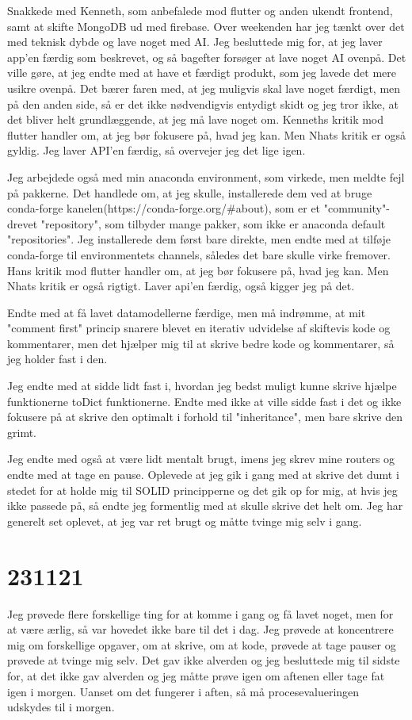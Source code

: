 \documentclass{report}
\begin{document}
Snakkede med Kenneth, som anbefalede mod flutter og anden ukendt frontend, samt at skifte MongoDB ud med firebase.
Over weekenden har jeg tænkt over det med teknisk dybde og lave noget med AI. Jeg besluttede mig for, at jeg laver app'en færdig som beskrevet, og så bagefter forsøger at lave noget AI ovenpå. Det ville gøre, at jeg endte med at have et færdigt produkt, som jeg lavede det mere usikre ovenpå. Det bærer faren med, at jeg muligvis skal lave noget færdigt, men på den anden side, så er det ikke nødvendigvis entydigt skidt og jeg tror ikke, at det bliver helt grundlæggende, at jeg må lave noget om.
Kenneths kritik mod flutter handler om, at jeg bør fokusere på, hvad jeg kan. Men Nhats kritik er også gyldig.
Jeg laver API'en færdig, så overvejer jeg det lige igen.
 
Jeg arbejdede også med min anaconda environment, som virkede, men meldte fejl på pakkerne. Det handlede om, at jeg skulle, installerede dem ved at bruge conda-forge kanelen(https://conda-forge.org/\#about), som er et "community"-drevet "repository", som tilbyder mange pakker, som ikke er anaconda default "repositories". Jeg installerede dem først bare direkte, men endte med at tilføje conda-forge til environmentets channels, således det bare skulle virke fremover.
Hans kritik mod flutter handler om, at jeg bør fokusere på, hvad jeg kan. Men Nhats kritik er også rigtigt. Laver api'en færdig, også kigger jeg på det.
 
Endte med at få lavet datamodellerne færdige, men må indrømme, at mit "comment first" princip snarere blevet en iterativ udvidelse af skiftevis kode og kommentarer, men det hjælper mig til at skrive bedre kode og kommentarer, så jeg holder fast i den.
 
Jeg endte med at sidde lidt fast i, hvordan jeg bedst muligt kunne skrive hjælpe funktionerne toDict funktionerne. Endte med ikke at ville sidde fast i det og ikke fokusere på at skrive den optimalt i forhold til "inheritance", men bare skrive den grimt.
 
Jeg endte med også at være lidt mentalt brugt, imens jeg skrev mine routers og endte med at tage en pause. Oplevede at jeg gik i gang med at skrive det dumt i stedet for at holde mig til SOLID principperne og det gik op for mig, at hvis jeg ikke passede på, så endte jeg formentlig med at skulle skrive det helt om.
Jeg har generelt set oplevet, at jeg var ret brugt og måtte tvinge mig selv i gang.

\section{231121}
Jeg prøvede flere forskellige ting for at komme i gang og få lavet noget, men for at være ærlig, så var hovedet ikke bare til det i dag.
Jeg prøvede at koncentrere mig om forskellige opgaver, om at skrive, om at kode, prøvede at tage pauser og prøvede at tvinge mig selv.
Det gav ikke alverden og jeg besluttede mig til sidste for, at det ikke gav alverden og jeg måtte prøve igen om aftenen eller tage fat igen i morgen.
Uanset om det fungerer i aften, så må procesevalueringen udskydes til i morgen.
 
\end{document}
